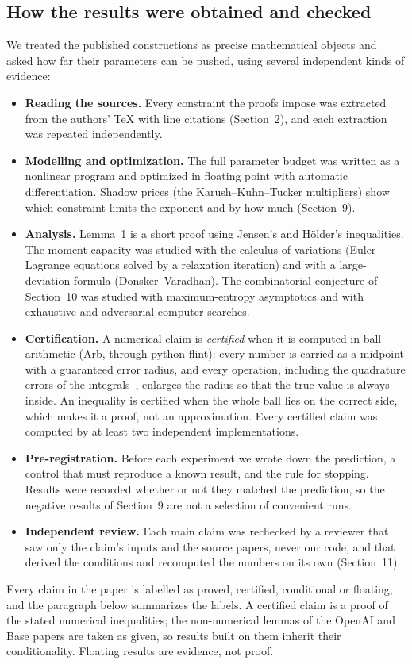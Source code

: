\documentclass[11pt]{article}
\theoremstyle{plain}
\begin{document}
\subsection*{How the results were obtained and checked}
We treated the published constructions as precise mathematical objects and asked how far their parameters can be pushed, using several independent kinds of evidence:
\begin{itemize}
\item \textbf{Reading the sources.} Every constraint the proofs impose was extracted from the authors' \TeX{} with line citations (Section~2), and each extraction was repeated independently.
\item \textbf{Modelling and optimization.} The full parameter budget was written as a nonlinear program and optimized in floating point with automatic differentiation. Shadow prices (the Karush--Kuhn--Tucker multipliers) show which constraint limits the exponent and by how much (Section~9).
\item \textbf{Analysis.} Lemma~1 is a short proof using Jensen's and H\"older's inequalities. The moment capacity was studied with the calculus of variations (Euler--Lagrange equations solved by a relaxation iteration) and with a large-deviation formula (Donsker--Varadhan). The combinatorial conjecture of Section~10 was studied with maximum-entropy asymptotics and with exhaustive and adversarial computer searches.
\item \textbf{Certification.} A numerical claim is \emph{certified} when it is computed in ball arithmetic (Arb, through python-flint): every number is carried as a midpoint with a guaranteed error radius, and every operation, including the quadrature errors of the integrals~\cite{tw}, enlarges the radius so that the true value is always inside. An inequality is certified when the whole ball lies on the correct side, which makes it a proof, not an approximation. Every certified claim was computed by at least two independent implementations.
\item \textbf{Pre-registration.} Before each experiment we wrote down the prediction, a control that must reproduce a known result, and the rule for stopping. Results were recorded whether or not they matched the prediction, so the negative results of Section~9 are not a selection of convenient runs.
\item \textbf{Independent review.} Each main claim was rechecked by a reviewer that saw only the claim's inputs and the source papers, never our code, and that derived the conditions and recomputed the numbers on its own (Section~11).
\end{itemize}
Every claim in the paper is labelled as proved, certified, conditional or floating, and the paragraph below summarizes the labels. A certified claim is a proof of the stated numerical inequalities; the non-numerical lemmas of the OpenAI and Base papers are taken as given, so results built on them inherit their conditionality. Floating results are evidence, not proof.
\end{document}
